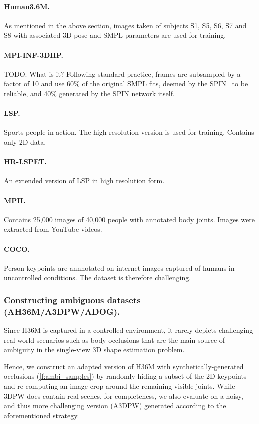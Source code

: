 \paragraph{Human3.6M.} As mentioned in the above section, images taken of subjects S1, S5, S6, S7 and S8 with associated 3D pose and SMPL parameters are used for training.

\paragraph{MPI-INF-3DHP.} TODO. What is it? Following standard practice, frames are subsampled by a factor of 10 and use 60\% of the original SMPL fits, deemed by the SPIN~\cite{kolotouros19learning} to be reliable, and 40\% generated by the SPIN network itself.

\paragraph{LSP.} Sports-people in action. The high resolution version is used for training. Contains only 2D data.

\paragraph{HR-LSPET.} An extended version of LSP in high resolution form.

\paragraph{MPII.} Contains 25,000 images of 40,000 people with annotated body joints. Images were extracted from YouTube videos.

\paragraph{COCO.} Person keypoints are annnotated on internet images captured of humans in uncontrolled conditions. The dataset is therefore challenging.

\subsubsection{Constructing ambiguous datasets (AH36M/A3DPW/ADOG).}
Since H36M is captured in a controlled environment, it rarely depicts challenging real-world scenarios such as body occlusions that are the main source of ambiguity in the single-view 3D shape estimation problem. 

Hence, we construct an adapted version of H36M with synthetically-generated occlusions (\cref{f:ambi_samples}) by randomly hiding a subset of the 2D keypoints and re-computing an image crop around the remaining visible joints. While 3DPW does contain real scenes, for completeness, we also evaluate on a noisy, and thus more challenging version (A3DPW) generated according to the aforementioned strategy. 

